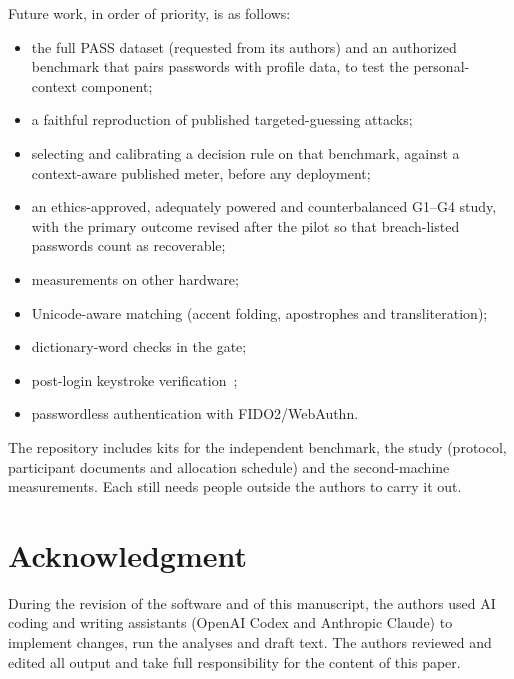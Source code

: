 \documentclass[conference]{IEEEtran}
\begin{document}
Future work, in order of priority, is as follows:
\begin{itemize}
\item the full PASS dataset (requested from its authors) and an authorized benchmark that pairs passwords with profile data, to test the personal-context component;
\item a faithful reproduction of published targeted-guessing attacks;
\item selecting and calibrating a decision rule on that benchmark, against a context-aware published meter, before any deployment;
\item an ethics-approved, adequately powered and counterbalanced G1--G4 study, with the primary outcome revised after the pilot so that breach-listed passwords count as recoverable;
\item measurements on other hardware;
\item Unicode-aware matching (accent folding, apostrophes and transliteration);
\item dictionary-word checks in the gate;
\item post-login keystroke verification~\cite{parkinson,rusli};
\item passwordless authentication with FIDO2/WebAuthn.
\end{itemize}
The repository includes kits for the independent benchmark, the study (protocol, participant documents and allocation schedule) and the second-machine measurements. Each still needs people outside the authors to carry it out.

\section*{Acknowledgment}
During the revision of the software and of this manuscript, the authors used AI coding and writing assistants (OpenAI Codex and Anthropic Claude) to implement changes, run the analyses and draft text. The authors reviewed and edited all output and take full responsibility for the content of this paper.
\end{document}
